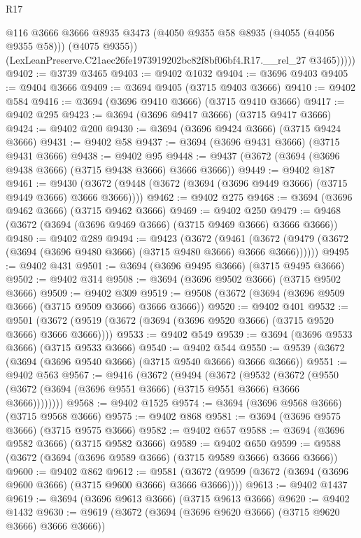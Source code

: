 \begin{lexlean}{R17}
\begin{coremodule}
              @116
              @3666
              @3666
              @8935
              @3473
              (@4050 @9355 @58 @8935 (@4055 (@4056 @9355 @58)))
              (@4075 @9355))
            (LexLeanPreserve.C21aec26fe1973919202bc82f8bf06bf4.R17.__rel_27 @3465)))))
@9402 := @3739 @3465
@9403 := @9402 @1032
@9404 := @3696 @9403
@9405 := @9404 @3666
@9409 := @3694 @9405 (@3715 @9403 @3666)
@9410 := @9402 @584
@9416 := @3694 (@3696 @9410 @3666) (@3715 @9410 @3666)
@9417 := @9402 @295
@9423 := @3694 (@3696 @9417 @3666) (@3715 @9417 @3666)
@9424 := @9402 @200
@9430 := @3694 (@3696 @9424 @3666) (@3715 @9424 @3666)
@9431 := @9402 @58
@9437 := @3694 (@3696 @9431 @3666) (@3715 @9431 @3666)
@9438 := @9402 @95
@9448 := @9437 (@3672 (@3694 (@3696 @9438 @3666) (@3715 @9438 @3666) @3666 @3666))
@9449 := @9402 @187
@9461 := @9430 (@3672 (@9448 (@3672 (@3694 (@3696 @9449 @3666) (@3715 @9449 @3666) @3666 @3666))))
@9462 := @9402 @275
@9468 := @3694 (@3696 @9462 @3666) (@3715 @9462 @3666)
@9469 := @9402 @250
@9479 := @9468 (@3672 (@3694 (@3696 @9469 @3666) (@3715 @9469 @3666) @3666 @3666))
@9480 := @9402 @289
@9494 := @9423
    (@3672
      (@9461 (@3672 (@9479 (@3672 (@3694 (@3696 @9480 @3666) (@3715 @9480 @3666) @3666 @3666))))))
@9495 := @9402 @431
@9501 := @3694 (@3696 @9495 @3666) (@3715 @9495 @3666)
@9502 := @9402 @314
@9508 := @3694 (@3696 @9502 @3666) (@3715 @9502 @3666)
@9509 := @9402 @309
@9519 := @9508 (@3672 (@3694 (@3696 @9509 @3666) (@3715 @9509 @3666) @3666 @3666))
@9520 := @9402 @401
@9532 := @9501 (@3672 (@9519 (@3672 (@3694 (@3696 @9520 @3666) (@3715 @9520 @3666) @3666 @3666))))
@9533 := @9402 @549
@9539 := @3694 (@3696 @9533 @3666) (@3715 @9533 @3666)
@9540 := @9402 @544
@9550 := @9539 (@3672 (@3694 (@3696 @9540 @3666) (@3715 @9540 @3666) @3666 @3666))
@9551 := @9402 @563
@9567 := @9416
    (@3672
      (@9494
        (@3672
          (@9532
            (@3672 (@9550 (@3672 (@3694 (@3696 @9551 @3666) (@3715 @9551 @3666) @3666 @3666))))))))
@9568 := @9402 @1525
@9574 := @3694 (@3696 @9568 @3666) (@3715 @9568 @3666)
@9575 := @9402 @868
@9581 := @3694 (@3696 @9575 @3666) (@3715 @9575 @3666)
@9582 := @9402 @657
@9588 := @3694 (@3696 @9582 @3666) (@3715 @9582 @3666)
@9589 := @9402 @650
@9599 := @9588 (@3672 (@3694 (@3696 @9589 @3666) (@3715 @9589 @3666) @3666 @3666))
@9600 := @9402 @862
@9612 := @9581 (@3672 (@9599 (@3672 (@3694 (@3696 @9600 @3666) (@3715 @9600 @3666) @3666 @3666))))
@9613 := @9402 @1437
@9619 := @3694 (@3696 @9613 @3666) (@3715 @9613 @3666)
@9620 := @9402 @1432
@9630 := @9619 (@3672 (@3694 (@3696 @9620 @3666) (@3715 @9620 @3666) @3666 @3666))

\end{coremodule}
\end{lexlean}
